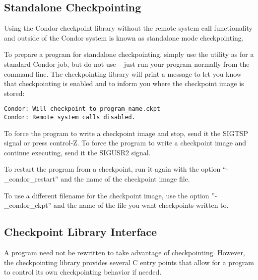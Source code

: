 \subsection{\label{sec:standalone-ckpt}Standalone Checkpointing}

Using the Condor checkpoint library without the remote system call
functionality and outside of the Condor system is known as standalone
mode checkpointing.

To prepare a program for standalone checkpointing, simply use the
 utility as for a standard Condor job, but do not
use  -- just run your program normally from the command
line.  The checkpointing library will print a message to let you know
that checkpointing is enabled and to inform you where the checkpoint
image is stored:

\begin{verbatim}
Condor: Will checkpoint to program_name.ckpt
Condor: Remote system calls disabled.
\end{verbatim}

To force the program to write a checkpoint image and stop, send it
the SIGTSP signal or press control-Z.  To force the program to 
write a checkpoint image and continue executing, send it the
SIGUSR2 signal.

To restart the program from a checkpoint, run it again with the
option ``-\_condor\_restart'' and the name of the checkpoint
image file.

To use a different filename for the checkpoint image, use the option
''-\_condor\_ckpt'' and the name of the file you want checkpoints
written to.

\subsection{\label{sec:ckpt-api}Checkpoint Library Interface}

A program need not be rewritten to take advantage of checkpointing.
However, the checkpointing library provides several C entry points
that allow for a program to control its own checkpointing behavior
if needed.

